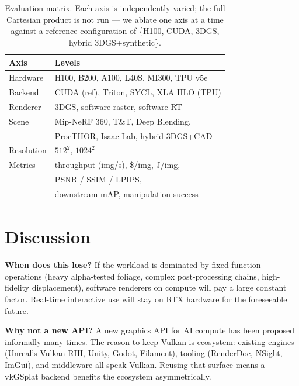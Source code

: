 \documentclass[10pt,journal]{IEEEtran}
\begin{document}
\begin{table}[t]
\centering
\caption{Evaluation matrix. Each axis is independently varied; the
full Cartesian product is not run --- we ablate one axis at a time
against a reference configuration of \{H100, CUDA, 3DGS,
hybrid 3DGS+synthetic\}.}
\label{tab:eval}
\small
\begin{tabular}{@{}ll@{}}
\toprule
\textbf{Axis} & \textbf{Levels} \\
\midrule
Hardware  & H100, B200, A100, L40S, MI300, TPU v5e \\
Backend   & CUDA (ref), Triton, SYCL, XLA HLO (TPU) \\
Renderer  & 3DGS, software raster, software RT \\
Scene     & Mip-NeRF 360, T\&T, Deep Blending,\\
          & ProcTHOR, Isaac Lab, hybrid 3DGS+CAD \\
Resolution & $512^2$, $1024^2$ \\
\midrule
Metrics   & throughput (img/s), \$/img, J/img, \\
          & PSNR / SSIM / LPIPS, \\
          & downstream mAP, manipulation success \\
\bottomrule
\end{tabular}
\end{table}

\section{Discussion}

\textbf{When does this lose?} If the workload is dominated by
fixed-function operations (heavy alpha-tested foliage, complex
post-processing chains, high-fidelity displacement), software renderers
on compute will pay a large constant factor. Real-time interactive use
will stay on RTX hardware for the foreseeable future.

\textbf{Why not a new API?} A new graphics API for AI compute has been
proposed informally many times. The reason to keep Vulkan is ecosystem:
existing engines (Unreal's Vulkan RHI, Unity, Godot, Filament), tooling
(RenderDoc, NSight, ImGui), and middleware all speak Vulkan. Reusing
that surface means a vkGSplat backend benefits the ecosystem
asymmetrically.
\end{document}
